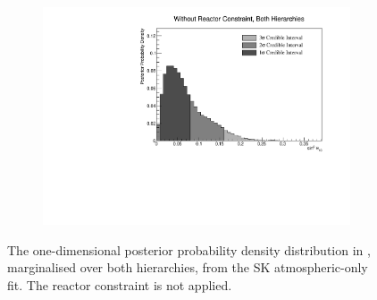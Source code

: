 
\begin{figure}[h]
  \begin{subfigure}[t]{0.98\textwidth}
    \includegraphics[width=\textwidth, trim={0mm 0mm 0mm 0mm}, clip,page=1]{Figures/OA/SKOnlyFit/Contours_1D_th13_BH_1_woRC_UnSmeared_CredibleInterval.pdf}
  \end{subfigure}
  \caption{The one-dimensional posterior probability density distribution in , marginalised over both hierarchies, from the SK atmospheric-only fit. The reactor constraint is not applied.}
  \label{fig:OscillationAnalysis_SKOnly_TH13}
\end{figure}

